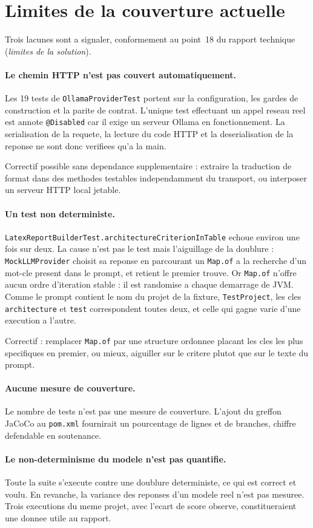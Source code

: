 \documentclass[12pt,a4paper]{article}
\begin{document}
\section{Limites de la couverture actuelle}

Trois lacunes sont a signaler, conformement au point~18 du rapport technique
(\emph{limites de la solution}).

\paragraph{Le chemin HTTP n'est pas couvert automatiquement.} Les 19 tests de
\texttt{OllamaProviderTest} portent sur la configuration, les gardes de
construction et la parite de contrat. L'unique test effectuant un appel reseau
reel est annote \texttt{@Disabled} car il exige un serveur Ollama en
fonctionnement. La serialisation de la requete, la lecture du code HTTP et la
deserialisation de la reponse ne sont donc verifiees qu'a la main.

Correctif possible sans dependance supplementaire : extraire la traduction de
format dans des methodes testables independamment du transport, ou interposer un
serveur HTTP local jetable.

\paragraph{Un test non deterministe.} \texttt{LatexReportBuilderTest.architectureCriterionInTable} echoue environ une
fois sur deux. La cause n'est pas le test mais l'aiguillage de la doublure :
\texttt{MockLLMProvider} choisit sa reponse en parcourant un \texttt{Map.of} a la
recherche d'un mot-cle present dans le prompt, et retient le premier trouve.
Or \texttt{Map.of} n'offre aucun ordre d'iteration stable : il est randomise a
chaque demarrage de JVM. Comme le prompt contient le nom du projet de la
fixture, \texttt{TestProject}, les cles \texttt{architecture} et \texttt{test}
correspondent toutes deux, et celle qui gagne varie d'une execution a l'autre.

Correctif : remplacer \texttt{Map.of} par une structure ordonnee placant les
cles les plus specifiques en premier, ou mieux, aiguiller sur le critere plutot
que sur le texte du prompt.

\paragraph{Aucune mesure de couverture.} Le nombre de tests n'est pas une mesure
de couverture. L'ajout du greffon JaCoCo au \texttt{pom.xml} fournirait un
pourcentage de lignes et de branches, chiffre defendable en soutenance.

\paragraph{Le non-determinisme du modele n'est pas quantifie.} Toute la suite
s'execute contre une doublure deterministe, ce qui est correct et voulu. En
revanche, la variance des reponses d'un modele reel n'est pas mesuree. Trois
executions du meme projet, avec l'ecart de score observe, constitueraient une
donnee utile au rapport.
\end{document}
